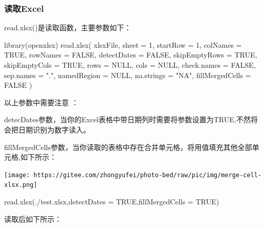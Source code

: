 \documentclass[
]{book}
\newenvironment{Shaded}{\begin{snugshade}}{\end{snugshade}}
\newcommand{\AttributeTok}[1]{\textcolor[rgb]{0.77,0.63,0.00}{#1}}
\newcommand{\ConstantTok}[1]{\textcolor[rgb]{0.00,0.00,0.00}{#1}}
\newcommand{\DecValTok}[1]{\textcolor[rgb]{0.00,0.00,0.81}{#1}}
\newcommand{\FunctionTok}[1]{\textcolor[rgb]{0.00,0.00,0.00}{#1}}
\newcommand{\NormalTok}[1]{#1}
\newcommand{\StringTok}[1]{\textcolor[rgb]{0.31,0.60,0.02}{#1}}
\begin{document}
\hypertarget{openxlsx:read-function}{%
\subsubsection{读取Excel}\label{openxlsx:read-function}}

read.xlsx()是读取函数，主要参数如下：

\begin{Shaded}
\begin{Highlighting}[]
\FunctionTok{library}\NormalTok{(openxlsx)}
\FunctionTok{read.xlsx}\NormalTok{(}
\NormalTok{  xlsxFile,}
  \AttributeTok{sheet =} \DecValTok{1}\NormalTok{,}
  \AttributeTok{startRow =} \DecValTok{1}\NormalTok{,}
  \AttributeTok{colNames =} \ConstantTok{TRUE}\NormalTok{,}
  \AttributeTok{rowNames =} \ConstantTok{FALSE}\NormalTok{,}
  \AttributeTok{detectDates =} \ConstantTok{FALSE}\NormalTok{,}
  \AttributeTok{skipEmptyRows =} \ConstantTok{TRUE}\NormalTok{,}
  \AttributeTok{skipEmptyCols =} \ConstantTok{TRUE}\NormalTok{,}
  \AttributeTok{rows =} \ConstantTok{NULL}\NormalTok{,}
  \AttributeTok{cols =} \ConstantTok{NULL}\NormalTok{,}
  \AttributeTok{check.names =} \ConstantTok{FALSE}\NormalTok{,}
  \AttributeTok{sep.names =} \StringTok{"."}\NormalTok{,}
  \AttributeTok{namedRegion =} \ConstantTok{NULL}\NormalTok{,}
  \AttributeTok{na.strings =} \StringTok{"NA"}\NormalTok{,}
  \AttributeTok{fillMergedCells =} \ConstantTok{FALSE}
\NormalTok{)}
\end{Highlighting}
\end{Shaded}

以上参数中需要注意 ：

detecDates参数，当你的Excel表格中带日期列时需要将参数设置为TRUE,不然将会把日期识别为数字读入。

fillMergedCells参数，当你读取的表格中存在合并单元格，将用值填充其他全部单元格,如下所示：

\texttt{[image: https://gitee.com/zhongyufei/photo-bed/raw/pic/img/merge-cell-xlsx.png]}

\begin{Shaded}
\begin{Highlighting}[]
\FunctionTok{read.xlsx}\NormalTok{(}\StringTok{\textquotesingle{}./test.xlsx\textquotesingle{}}\NormalTok{,}\AttributeTok{detectDates =} \ConstantTok{TRUE}\NormalTok{,}\AttributeTok{fillMergedCells =} \ConstantTok{TRUE}\NormalTok{)}
\end{Highlighting}
\end{Shaded}

读取后如下所示：
\end{document}
